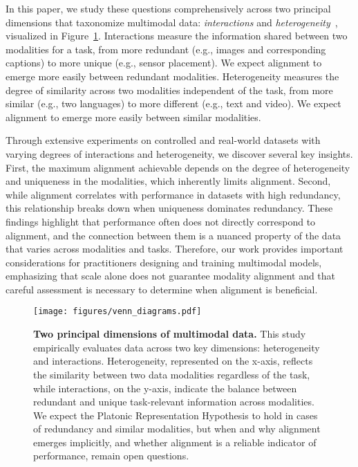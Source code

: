 In this paper, we study these questions comprehensively across two principal dimensions that taxonomize multimodal data: \textit{interactions} and \textit{heterogeneity}~\citep{baltruvsaitis2018multimodal,liang2024foundations,tian2020makes}, visualized in Figure~\ref{fig:dimensions}. Interactions measure the information shared between two modalities for a task, from more redundant (e.g., images and corresponding captions) to more unique (e.g., sensor placement). We expect alignment to emerge more easily between redundant modalities. Heterogeneity measures the degree of similarity across two modalities independent of the task, from more similar (e.g., two languages) to more different (e.g., text and video). We expect alignment to emerge more easily between similar modalities.

Through extensive experiments on controlled and real-world datasets with varying degrees of interactions and heterogeneity, we discover several key insights. First, the maximum alignment achievable depends on the degree of heterogeneity and uniqueness in the modalities, which inherently limits alignment. Second, while alignment correlates with performance in datasets with high redundancy, this relationship breaks down when uniqueness dominates redundancy. These findings highlight that performance often does not directly correspond to alignment, and the connection between them is a nuanced property of the data that varies across modalities and tasks. Therefore, our work provides important considerations for practitioners designing and training multimodal models, emphasizing that scale alone does not guarantee modality alignment and that careful assessment is necessary to determine when alignment is beneficial.

\begin{figure}[t!]
    \centering
    \texttt{[image: figures/venn\_diagrams.pdf]}
    \caption{\textbf{Two principal dimensions of multimodal data.} This study empirically evaluates data across two key dimensions: heterogeneity and interactions. Heterogeneity, represented on the x-axis, reflects the similarity between two data modalities regardless of the task, while interactions, on the y-axis, indicate the balance between redundant and unique task-relevant information across modalities. We expect the Platonic Representation Hypothesis to hold in cases of redundancy and similar modalities, but when and why alignment emerges implicitly, and whether alignment is a reliable indicator of performance, remain open questions.}
    \label{fig:dimensions}
\end{figure}